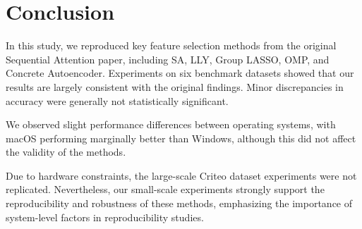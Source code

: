 \documentclass[a4paper,twocolumn]{article} %
\begin{document}
\section{Conclusion}
In this study, we reproduced key feature selection methods from the original Sequential Attention paper, including SA, LLY, Group LASSO, OMP, and Concrete Autoencoder. Experiments on six benchmark datasets showed that our results are largely consistent with the original findings. Minor discrepancies in accuracy were generally not statistically significant.

We observed slight performance differences between operating systems, with macOS performing marginally better than Windows, although this did not affect the validity of the methods.

Due to hardware constraints, the large-scale Criteo dataset experiments were not replicated. Nevertheless, our small-scale experiments strongly support the reproducibility and robustness of these methods, emphasizing the importance of system-level factors in reproducibility studies.


\end{document}
